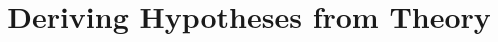 
\usepackage{tikz}
\usetikzlibrary{shapes,arrows}

\title{Deriving Hypotheses from Theory}



\date[]{}



\frame{\titlepage}

\frame{\tableofcontents}


\frame{\tableofcontents[currentsection]}




\appendix
\frame{}


